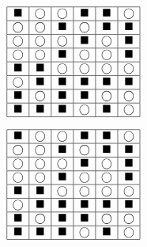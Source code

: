 \documentclass[twocolumn]{ximera}
\begin{document}
\[
\begin{array}{|c|c|c|c|c|c|}\hline
\blacksquare & \bigcirc & \bigcirc & \blacksquare & \blacksquare & \bigcirc \\\hline
\bigcirc & \bigcirc & \blacksquare & \bigcirc & \blacksquare & \blacksquare \\\hline
\bigcirc & \bigcirc & \bigcirc & \blacksquare & \bigcirc & \blacksquare \\\hline
\bigcirc & \bigcirc & \blacksquare & \bigcirc & \bigcirc & \blacksquare \\\hline
\blacksquare & \blacksquare & \bigcirc & \bigcirc & \bigcirc & \bigcirc \\\hline
\bigcirc & \blacksquare & \blacksquare & \blacksquare & \blacksquare & \blacksquare \\\hline
\blacksquare & \bigcirc & \blacksquare & \blacksquare & \bigcirc & \bigcirc \\\hline
\blacksquare & \blacksquare & \blacksquare & \bigcirc & \blacksquare & \bigcirc \\\hline
\end{array}
\]


\[
\begin{array}{|c|c|c|c|c|c|}\hline
\blacksquare & \bigcirc & \bigcirc & \blacksquare & \blacksquare & \bigcirc \\\hline
\bigcirc & \bigcirc & \blacksquare & \bigcirc & \blacksquare & \blacksquare \\\hline
\bigcirc & \bigcirc & \bigcirc & \blacksquare & \bigcirc & \blacksquare \\\hline
\bigcirc & \bigcirc & \blacksquare & \bigcirc & \bigcirc & \blacksquare \\\hline
\blacksquare & \blacksquare & \bigcirc & \bigcirc & \bigcirc & \bigcirc \\\hline
\bigcirc & \blacksquare & \blacksquare & \blacksquare & \blacksquare & \blacksquare \\\hline
\blacksquare & \bigcirc & \blacksquare & \blacksquare & \bigcirc & \bigcirc \\\hline
\blacksquare & \blacksquare & \blacksquare & \bigcirc & \blacksquare & \bigcirc \\\hline
\end{array}
\]
\end{document}
